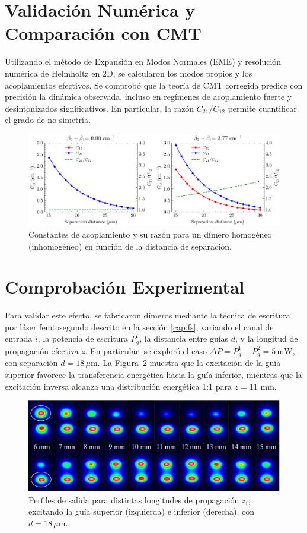 \section{Validación Numérica y Comparación con CMT}

Utilizando el método de Expansión en Modos Normales (EME) y resolución numérica de Helmholtz en 2D, se calcularon los modos propios y los acoplamientos efectivos. Se comprobó que la teoría de CMT corregida predice con precisión la dinámica observada, incluso en regímenes de acoplamiento fuerte y desintonizados significativos. En particular, la razón \( C_{21}/C_{12} \) permite cuantificar el grado de no simetría.
\begin{figure}[H]
	\centering
	\includegraphics[width=\linewidth]{media/cij-nonortho.png}
	\caption{Constantes de acoplamiento y su razón para un dímero homogéneo (inhomogéneo) en función de la distancia de separación. \label{fig:nonotrho-num}}
\end{figure}
\section{Comprobación Experimental}

Para validar este efecto, se fabricaron dímeros mediante la técnica de escritura por láser femtosegundo descrito en la sección \ref{cap:fs}, variando el canal de entrada \( i \), la potencia de escritura \( P_{g}^i \), la distancia entre guías \( d \), y la longitud de propagación efectiva \( z \). En particular, se exploró el caso \( \Delta P = P_g^1 - P_g^2 = 5\,\mathrm{mW} \), con separación \( d = 18\,\mu\mathrm{m} \). La Figura~\ref{fig:nosymexp} muestra que la excitación de la guía superior favorece la transferencia energética hacia la guía inferior, mientras que la excitación inversa alcanza una distribución energética 1:1 para $z=11$ mm.

\begin{figure}[H]
	\centering
	\includegraphics[width=\linewidth]{media/nonsymm-exp.png}
	\caption{Perfiles de salida para distintas longitudes de propagación \( z_i \), excitando la guía superior (izquierda) e inferior (derecha), con \( d = 18\,\mu\mathrm{m} \). \label{fig:nosymexp}}
\end{figure}

